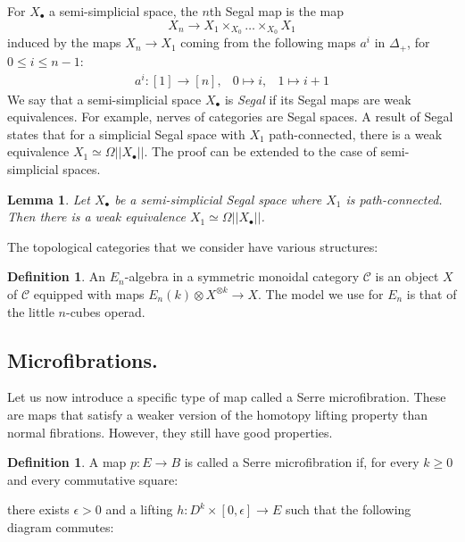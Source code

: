 \documentclass[12pt]{amsart}
\theoremstyle{plain}
\newtheorem{lem}[teo]{Lemma}
\theoremstyle{definition}
\newtheorem{defi}[teo]{Definition}
\theoremstyle{remark}
\newcommand{\C}{\mathcal{C}}
\begin{document}
For $X_\bullet$ a semi-simplicial space, the $n$th Segal map is the map
    \[X_n \rightarrow X_1\times_{X_0}\dots\times_{X_0} X_1\] induced by the maps $X_n\rightarrow X_1$ coming from the following maps $a^{i}$ in $\Delta_+$, for $0\leq i\leq n-1$:
    $$\begin{array}{rrr}
        a^{i}:[1] \rightarrow [n], & 0\mapsto i, & 1\mapsto i+1
    \end{array}$$
We say that a semi-simplicial space $X_\bullet$ is \emph{Segal} if its Segal maps are weak equivalences. For example, nerves of categories are Segal spaces.
A result of Segal \cite[Proposition~1.5]{segal74} states that for a simplicial Segal space with $X_1$ path-connected, there is a weak equivalence $X_1\simeq\Omega\vert\vert X_\bullet\vert\vert$.
The proof can be extended to the case of semi-simplicial spaces.

\begin{lem}\label{semiSegal}
Let $X_\bullet$ be a semi-simplicial Segal space where $X_1$ is path-connected. Then there is a weak equivalence $X_1\simeq\Omega\vert\vert X_\bullet\vert\vert$.
\end{lem}

The topological categories that we consider have various structures:
\begin{defi}\cite[Chapter 4]{may}
An $E_n$-algebra in a symmetric monoidal category $\C$ is an object $X$ of $\C$ equipped with maps $E_n(k)\otimes X^{\otimes k}\rightarrow X$.
The model we use for $E_n$ is that of the little $n$-cubes operad.
\end{defi}

\subsection{Microfibrations.}
Let us now introduce a specific type of map called a Serre microfibration. 
These are maps that satisfy a weaker version of the homotopy lifting property than normal fibrations. 
However, they still have good properties.
\begin{defi}
A map $p:E\rightarrow B$ is called a Serre microfibration if, for every $k\geq 0$ and every commutative square:
\begin{center}
\end{center}
there exists $\epsilon>0$ and a lifting $h:D^k\times [0,\epsilon]\rightarrow E$ such that the following diagram commutes:
\begin{center}
\end{center}
\end{defi}
\end{document}
